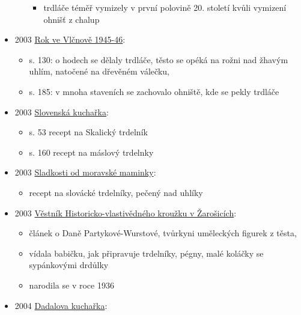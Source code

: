 \begin{itemize}
\begin{itemize}
    \begin{itemize}
    \tightlist
    \item
      trdláče téměř vymizely v první polovině 20. století kvůli vymizení
      ohnišť z chalup
    \end{itemize}
  \end{itemize}
\item
  2003
  \href{https://ceskadigitalniknihovna.cz/uuid/uuid:72938430-ef5f-11e5-bdc9-005056827e52}{Rok
  ve Vlčnově 1945-46}:

  \begin{itemize}
  \tightlist
  \item
    s. 130: o hodech se dělaly trdláče, těsto se opéká na rožni nad
    žhavým uhlím, natočené na dřevěném válečku,
  \item
    s. 185: v mnoha staveních se zachovalo ohniště, kde se pekly trdláče
  \end{itemize}
\item
  2003
  \href{https://ceskadigitalniknihovna.cz/view/uuid:b004cc10-6352-11e4-b42a-005056827e52?page=uuid\%3A70d8a160-6799-11e4-8fe2-5ef3fc9bb22f&fulltext=trdeln\%C3\%ADk\%20OR\%20trdeln\%C3\%ADky\%20OR\%20trdeln\%C3\%ADk\%C5\%AF&source=mzk}{Slovenská
  kuchařka}:

  \begin{itemize}
  \tightlist
  \item
    s. 53 recept na Skalický trdelník
  \item
    s. 160 recept na máslový trdelnky
  \end{itemize}
\item
  2003
  \href{https://ceskadigitalniknihovna.cz/view/uuid:cdea10f0-f64a-11e5-8d5f-005056827e51?page=uuid\%3A866b8a90-2194-11e6-8145-5ef3fc9bb22f&fulltext=trdeln\%C3\%ADk\%20OR\%20trdeln\%C3\%ADky\%20OR\%20trdeln\%C3\%ADk\%C5\%AF&source=mzk}{Sladkosti
  od moravské maminky}:

  \begin{itemize}
  \tightlist
  \item
    recept na slovácké trdelníky, pečený nad uhlíky
  \end{itemize}
\item
  2003
  \href{https://ceskadigitalniknihovna.cz/uuid/uuid:d6ed8ce0-451c-11e3-9c86-005056827e51}{Věstník
  Historicko-vlastivědného kroužku v Žarošicích}:

  \begin{itemize}
  \tightlist
  \item
    článek o Daně Partykové-Wurstové, tvůrkyni uměleckých figurek z
    těsta,
  \item
    vídala babičku, jak připravuje trdelníky, pégny, malé koláčky se
    sypánkovými drdůlky
  \item
    narodila se v roce 1936
  \end{itemize}
\item
  2004
  \href{https://dadala.hyperlinx.cz/hypsladkuch/ost/ostr0025.html}{Dadalova
  kuchařka}:


\end{itemize}
